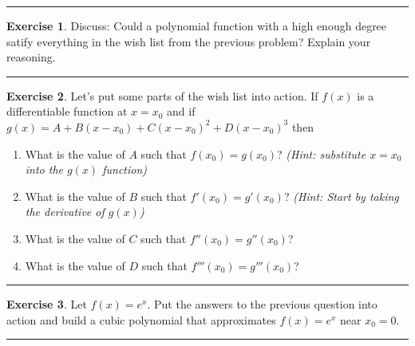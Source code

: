 \documentclass[
]{book}
\providecommand{\tightlist}{%
  \setlength{\itemsep}{0pt}\setlength{\parskip}{0pt}}
\theoremstyle{definition}
\theoremstyle{definition}
\theoremstyle{definition}
\newtheorem{exercise}{Exercise}[chapter]
\theoremstyle{remark}
\begin{document}
\begin{center}\rule{0.5\linewidth}{0.5pt}\end{center}

\begin{exercise}
\protect\hypertarget{exr:unnamed-chunk-29}{}{\label{exr:unnamed-chunk-29} }Discuss: Could a polynomial function with a high enough degree satify everything in the wish list from the previous problem? Explain your reasoning.
\end{exercise}

\begin{center}\rule{0.5\linewidth}{0.5pt}\end{center}

\begin{exercise}
\protect\hypertarget{exr:unnamed-chunk-30}{}{\label{exr:unnamed-chunk-30} }Let's put some parts of the wish list into action.
If \(f(x)\) is a differentiable function at \(x=x_0\) and if \(g(x) = A + B (x-x_0) + C (x-x_0)^2 + D (x-x_0)^3\) then

\begin{enumerate}
\def\labelenumi{\alph{enumi}.}
\tightlist
\item
  What is the value of \(A\) such that \(f(x_0) = g(x_0)\)? \emph{(Hint: substitute \(x=x_0\) into the \(g(x)\) function)}
\item
  What is the value of \(B\) such that \(f'(x_0) = g'(x_0)\)? \emph{(Hint: Start by taking the derivative of \(g(x)\))}
\item
  What is the value of \(C\) such that \(f''(x_0) = g''(x_0)\)?
\item
  What is the value of \(D\) such that \(f'''(x_0) = g'''(x_0)\)?
\end{enumerate}
\end{exercise}

\begin{center}\rule{0.5\linewidth}{0.5pt}\end{center}

\begin{exercise}
\protect\hypertarget{exr:unnamed-chunk-31}{}{\label{exr:unnamed-chunk-31} }Let \(f(x) = e^x\). Put the answers to the previous question into action and build a cubic polynomial that approximates \(f(x) = e^x\) near \(x_0=0\).
\end{exercise}

\begin{center}\rule{0.5\linewidth}{0.5pt}\end{center}
\end{document}
